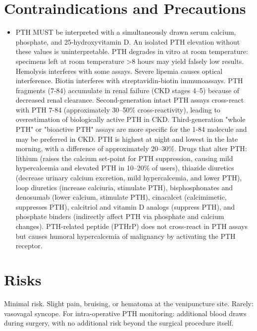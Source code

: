 \section*{Contraindications and Precautions}
\begin{itemize}
  \item PTH MUST be interpreted with a simultaneously drawn serum calcium, phosphate, and 25-hydroxyvitamin D. An isolated PTH elevation without these values is uninterpretable. PTH degrades in vitro at room temperature: specimens left at room temperature >8 hours may yield falsely low results. Hemolysis interferes with some assays. Severe lipemia causes optical interference. Biotin interferes with streptavidin-biotin immunoassays. PTH fragments (7-84) accumulate in renal failure (CKD stages 4--5) because of decreased renal clearance. Second-generation intact PTH assays cross-react with PTH 7-84 (approximately 30--50\% cross-reactivity), leading to overestimation of biologically active PTH in CKD. Third-generation "whole PTH" or "bioactive PTH" assays are more specific for the 1-84 molecule and may be preferred in CKD. PTH is highest at night and lowest in the late morning, with a difference of approximately 20--30\%. Drugs that alter PTH: lithium (raises the calcium set-point for PTH suppression, causing mild hypercalcemia and elevated PTH in 10--20\% of users), thiazide diuretics (decrease urinary calcium excretion, mild hypercalcemia, and lower PTH), loop diuretics (increase calciuria, stimulate PTH), bisphosphonates and denosumab (lower calcium, stimulate PTH), cinacalcet (calcimimetic, suppresses PTH), calcitriol and vitamin D analogs (suppress PTH), and phosphate binders (indirectly affect PTH via phosphate and calcium changes). PTH-related peptide (PTHrP) does not cross-react in PTH assays but causes humoral hypercalcemia of malignancy by activating the PTH receptor.
\end{itemize}
\section*{Risks}
Minimal risk. Slight pain, bruising, or hematoma at the venipuncture site. Rarely: vasovagal syncope. For intra-operative PTH monitoring: additional blood draws during surgery, with no additional risk beyond the surgical procedure itself.

